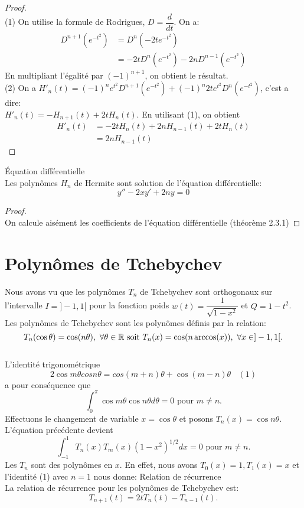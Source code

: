 \begin{proof}
$ $\\(1) On utilise la formule de Rodrigues, $ D=\dfrac{d}{dt}$. On a:
\begin{align*}
D^{n+1}(e^{-t^{2}}) & = D^{n}(-2te^{-t^{2}})\\
& = -2tD^{n}(e^{-t^{2}})-2nD^{n-1}(e^{-t^{2}})
\end{align*}
En multipliant l'égalité par $ (-1)^{n+1} $, on obtient le résultat.
\\$ $\\(2) On a $ {H'}_{n}(t) = (-1)^{n}e^{t^{2}}D^{n+1}(e^{-t^{2}})+(-1)^{n}2te^{t^{2}}D^{n}(e^{-t^{2}})$, c'est a dire:
\\$ {H'}_{n}(t) =-H_{n+1}(t)+2tH_{n}(t) $. En utilisant (1), on obtient 
\begin{align*}
{H'}_{n}(t) & = -2tH_{n}(t)+2nH_{n-1}(t)+2tH_{n}(t)\\
& = 2nH_{n-1}(t)
\end{align*}
\end{proof}

\bprop
Équation différentielle
\\Les polynômes $ H_{n} $ de Hermite sont solution de l'équation différentielle:
$$y''-2xy'+2ny = 0$$
\eprop

\begin{proof}
$ $\\
On calcule aisément les coefficients de l'équation différentielle (théorème 2.3.1)
\end{proof}

\section{Polynômes de Tchebychev}
Nous avons vu que les polynômes $T_{n}$ de Tchebychev sont orthogonaux sur l'intervalle $I=]-1, 1[$ pour la fonction poids $w(t)=\dfrac{1}{\sqrt{1-x^{2}}}$ et $Q=1-t^{2}$. 
\\Les polynômes de Tchebychev sont les polynômes définis par la relation:
\\$$ T_{n}(\cos \theta)=\cos (n\theta),\ \forall \theta \in \mathbb R \text{ soit }  T_{n}(x)=\cos (n\arccos(x)),\ \forall x \in ]-1, 1[ .$$
\\$ $\\ L'identité trigonométrique $$2\cos m\theta cos n\theta=cos(m+n)\theta + \cos (m-n)\theta\ \ \ \ (1)$$
a pour conséquence que $$\int_0^{\pi} {\cos m\theta \cos n\theta d\theta}=0 \text{ pour } m\neq n.$$
Effectuons le changement de variable $x=\cos\theta$ et posons $T_n(x)=\cos n\theta$.
\\L'équation précédente devient $$\int_{-1}^1{T_n(x)T_m(x)(1-x^2)^{1/2}dx}=0 \text{ pour } m \neq n.$$
Les $T_n$ sont des polynômes en $x$. En effet, nous avons $T_0(x)=1, T_1(x)=x$ et l'identité (1) avec $n=1$  nous donne:
\bprop
Relation de récurrence
\\La relation de récurrence pour les polynômes de Tchebychev est:
$$T_{n+1}(t)=2tT_{n}(t)-T_{n-1}(t).$$
\eprop

